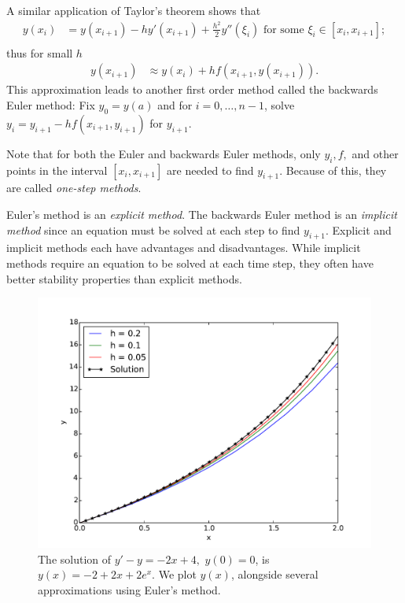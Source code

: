 A similar application of Taylor's theorem shows that
\begin{align*}
y(x_{i}) &= y(x_{i+1}) - h y'(x_{i+1}) + \frac{h^2}{2} y''(\xi_i) \text{ for some } \xi_i \in [x_i,x_{i+1}]; \\
\end{align*}
thus for small $h$
\begin{align*}
y(x_{i+1}) &\approx  y(x_{i}) + h f(x_{i+1},y(x_{i+1})).
\end{align*}
This approximation leads to another first order method called the backwards Euler method: Fix $y_0 = y(a)$ and for $i = 0, \hdots, n-1$, solve  $y_{i} = y_{i+1}-hf(x_{i+1},y_{i+1})$ for $y_{i+1}$.

Note that for both the Euler and backwards Euler methods, only $y_i, f,$ and other points in the interval $[x_i, x_{i+1}]$ are needed to find $y_{i+1}$. 
Because of this, they are called \textit{one-step methods}.

Euler's method is an \textit{explicit method}. 
The backwards Euler method is an \textit{implicit method} since an equation must be solved at each step to find $y_{i+1}$. 
Explicit and implicit methods each have advantages and disadvantages. 
While implicit methods require an equation to be solved at each time step, they often have better stability properties than explicit methods.

\begin{figure}[ht]
\centering
\includegraphics[width=\textwidth]{Fig1.pdf}
\caption{The solution of $y' - y= -2x+4,$ $y(0) = 0$, is $y(x) = -2+2x + 2e^x.$ 
We plot $y(x)$, alongside several approximations using Euler's method.}
\label{ivp:euler}
\end{figure}



